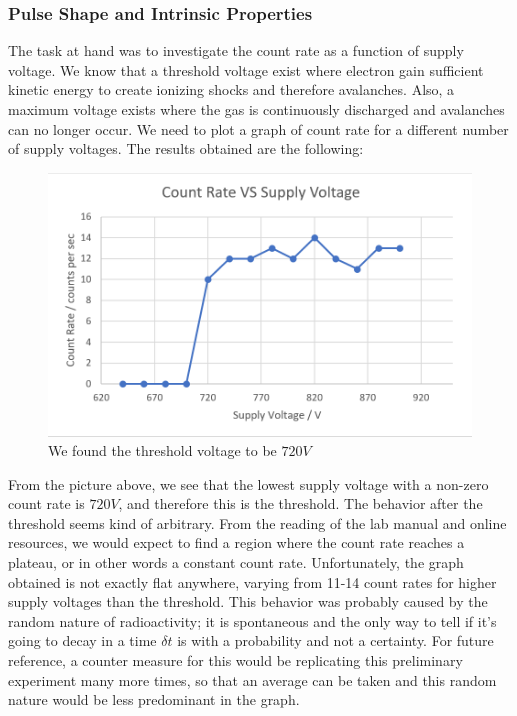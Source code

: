 \documentclass[a4paper]{article}
\begin{document}
 \subsubsection{Pulse Shape and Intrinsic Properties}
 The task at hand was to investigate the count rate as a function of supply voltage. We know that a threshold voltage exist where electron gain sufficient kinetic energy to create ionizing shocks and therefore avalanches. Also, a maximum voltage exists where the gas is continuously discharged and avalanches can no longer occur. We need to plot a graph of count rate for a different number of supply voltages. The results obtained are the following:
 
 \begin{figure}[h]
  \includegraphics[scale=0.75]{plateau} 
  \centering
  \caption{We found the threshold voltage to be $720V$}
  \end{figure}
  
  From the picture above, we see that the lowest supply voltage with a non-zero count rate is $720V$, and therefore this is the threshold. The behavior after the threshold seems kind of arbitrary. From the reading of the lab manual and online resources, we would expect to find a region where the count rate reaches a plateau, or in other words a constant count rate. Unfortunately, the graph obtained is not exactly flat anywhere, varying from 11-14 count rates for higher supply voltages than the threshold. This behavior was probably caused by the random nature of radioactivity; it is spontaneous and the only way to tell if it's going to decay in a time $\delta t$ is with a probability and not a certainty. For future reference, a counter measure for this would be replicating this preliminary experiment many more times, so that an average can be taken and this random nature would be less predominant in the graph.
 
\end{document}
